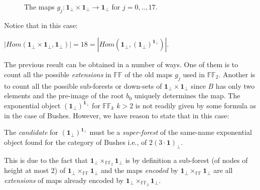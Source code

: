 \begin{figure}[h]
	\caption{The maps $g_j : \textbf{1}_\bot \times \textbf{1}_\bot \rightarrow \textbf{1}_\bot$ for $ j=0,..,17 $. }
\end{figure}

Notice that in this case:
\begin{lem}
	$|Hom(\textbf{1}_\bot \times \textbf{1}_\bot, \textbf{1}_\bot)|=18=|Hom(\textbf{1}_\bot, (\textbf{1}_\bot)^{\textbf{1}_\bot})|$.
\end{lem}
The previous result can be obtained in a number of ways. One of them is to count all the possible \emph{extensions} in $\mathbb{FF}$ of the old maps $g_j$ used in $\mathbb{FF}_2$. Another is to count all the possible sub-forests or down-sets of $\textbf{1}_\bot \times \textbf{1}_\bot$ since $B$ has only two elements and the pre-image of the root $b_0$ uniquely determines the map. \newline
The exponential object $(\textbf{1}_\bot)^{\textbf{1}_\bot}$ for $\mathbb{FF}_k$ $k>2$ is not readily given by some formula as in the case of Bushes. 
However, we have reason to state that in this case:
\begin{lem}\label{lem:superforest}
The \emph{candidate} for $(\textbf{1}_\bot)^{\textbf{1}_\bot}$ must be a \emph{super-forest} of the same-name exponential object found for the category of Bushes i.e., of $ 2(3 \cdot \textbf{1})_\bot $.
\end{lem}
This is due to the fact that $\textbf{1}_\bot \times_{\mathbb{FF}_2} \textbf{1}_\bot$ is by definition a sub-forest (of nodes of height at most 2) of $\textbf{1}_\bot \times_{\mathbb{FF}} \textbf{1}_\bot$ and the maps \emph{encoded} by $\textbf{1}_\bot \times_{\mathbb{FF}} \textbf{1}_\bot$ are all \emph{extensions} of maps already encoded by $\textbf{1}_\bot \times_{\mathbb{FF}_2} \textbf{1}_\bot$. 


